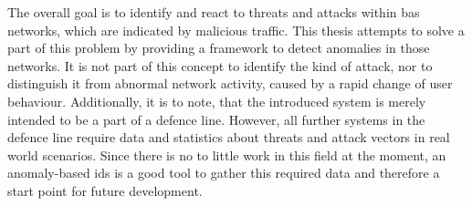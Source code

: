 The overall goal is to identify and react to threats and attacks within \gls{bas} networks, which are indicated by malicious traffic.
This thesis attempts to solve a part of this problem by providing a framework to detect anomalies in those networks.
It is not part of this concept to identify the kind of attack, nor to distinguish it from abnormal network activity, caused by a rapid change of user behaviour.
Additionally, it is to note, that the introduced system is merely intended to be a part of a defence line.
However, all further systems in the defence line require data and statistics about threats and attack vectors in real world scenarios.
Since there is no to little work in this field at the moment, an anomaly-based \gls{ids} is a good tool to gather this required data and therefore a start point for future development.

